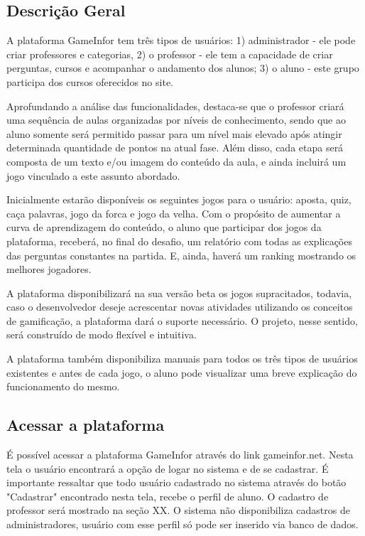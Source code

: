 \subsection{Descrição Geral}

A plataforma GameInfor  tem três tipos de usuários: 1) administrador - ele pode criar professores e categorias, 2) o professor - ele tem a capacidade de criar perguntas, cursos e acompanhar o andamento dos alunos; 3) o aluno - este grupo participa dos cursos oferecidos no site.  

Aprofundando a análise das funcionalidades, destaca-se que o professor criará uma sequência de aulas organizadas por níveis de conhecimento, sendo que ao aluno somente será permitido passar para um nível mais elevado após atingir determinada quantidade de pontos na atual fase. Além disso, cada etapa será composta de um texto e/ou imagem do conteúdo da aula, e ainda incluirá um jogo vinculado a este assunto abordado.

Inicialmente estarão disponíveis os seguintes jogos para o usuário: aposta, quiz, caça palavras, jogo da forca e jogo da velha. Com o propósito de aumentar a curva de aprendizagem do conteúdo, o aluno que participar dos jogos da plataforma, receberá, no final do desafio, um relatório com todas as explicações das perguntas constantes na partida. E, ainda, haverá um ranking mostrando os melhores jogadores.

A plataforma disponibilizará na sua versão beta os jogos supracitados, todavia, caso o desenvolvedor deseje acrescentar novas atividades utilizando os conceitos de gamificação, a plataforma dará o suporte necessário. O projeto, nesse sentido, será construído de modo flexível e intuitiva.

A plataforma também disponibiliza manuais para todos os três tipos de usuários existentes e antes de cada jogo, o aluno pode visualizar uma breve explicação do funcionamento do mesmo.


\subsection{Acessar a plataforma}

É possível acessar a plataforma GameInfor através do link gameinfor.net. Nesta tela o usuário encontrará a opção de logar no sistema e de se cadastrar. É importante ressaltar que todo usuário cadastrado no sistema através do botão "Cadastrar" encontrado nesta tela, recebe o perfil de aluno. O cadastro de professor será mostrado na seção XX. O sistema não disponibiliza cadastros de administradores, usuário com esse perfil só pode ser inserido via banco de dados.

